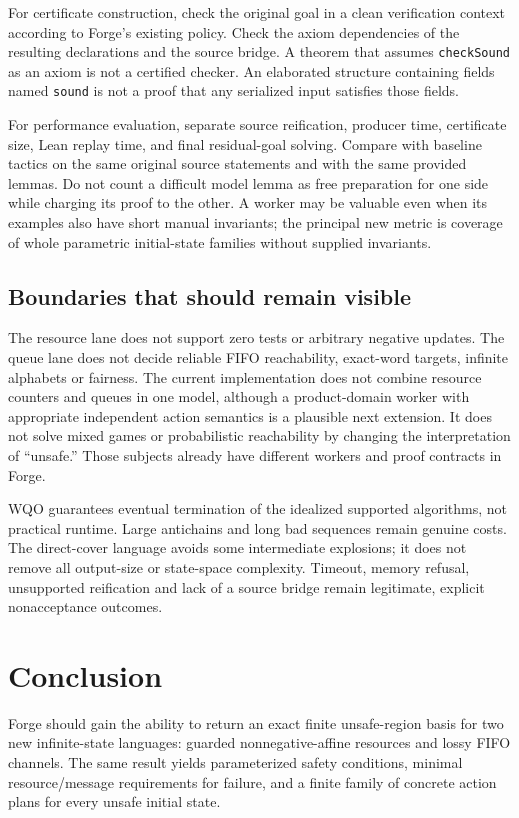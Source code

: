 \documentclass[11pt,a4paper]{article}
\theoremstyle{definition}
\newcommand{\code}[1]{\texttt{#1}}
\begin{document}
For certificate construction, check the original goal in a clean verification
context according to Forge's existing policy. Check the axiom dependencies of
the resulting declarations and the source bridge. A theorem that assumes
\code{checkSound} as an axiom is not a certified checker. An elaborated
structure containing fields named \code{sound} is not a proof that any
serialized input satisfies those fields.

For performance evaluation, separate source reification, producer time,
certificate size, Lean replay time, and final residual-goal solving. Compare
with baseline tactics on the same original source statements and with the same
provided lemmas. Do not count a difficult model lemma as free preparation for
one side while charging its proof to the other. A worker may be valuable even
when its examples also have short manual invariants; the principal new metric
is coverage of whole parametric initial-state families without supplied
invariants.

\subsection{Boundaries that should remain visible}
The resource lane does not support zero tests or arbitrary negative updates.
The queue lane does not decide reliable FIFO reachability, exact-word targets,
infinite alphabets or fairness. The current implementation does not combine
resource counters and queues in one model, although a product-domain worker
with appropriate independent action semantics is a plausible next extension.
It does not solve mixed games or probabilistic reachability by changing the
interpretation of ``unsafe.'' Those subjects already have different workers
and proof contracts in Forge.

WQO guarantees eventual termination of the idealized supported algorithms,
not practical runtime. Large antichains and long bad sequences remain genuine
costs. The direct-cover language avoids some intermediate explosions; it does
not remove all output-size or state-space complexity. Timeout, memory refusal,
unsupported reification and lack of a source bridge remain legitimate,
explicit nonacceptance outcomes.

\section{Conclusion}
Forge should gain the ability to return an exact finite unsafe-region basis
for two new infinite-state languages: guarded nonnegative-affine resources
and lossy FIFO channels. The same result yields parameterized safety
conditions, minimal resource/message requirements for failure, and a finite
family of concrete action plans for every unsafe initial state.
\end{document}
